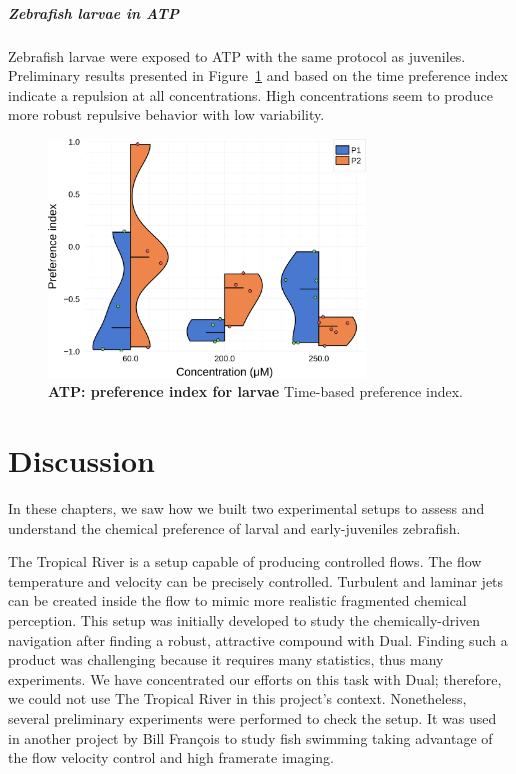     \paragraph{Zebrafish larvae in ATP} Zebrafish larvae were exposed to ATP with the same protocol as juveniles. Preliminary results presented in Figure~\ref{dist_atp_lar} and based on the time preference index indicate a repulsion at all concentrations. High concentrations seem to produce more robust repulsive behavior with low variability.

    \begin{figure}[h!]
      \centering
      \includegraphics[width=0.75\textwidth]{part_2/assets/dist_atp_lar.png}
      \caption{\textbf{ATP: preference index for larvae} Time-based preference index. }
      \label{dist_atp_lar}
    \end{figure}

  \chapter{Discussion}
  \label{discussion}
  In these chapters, we saw how we built two experimental setups to assess and understand the chemical preference of larval and early-juveniles zebrafish.

  The Tropical River is a setup capable of producing controlled flows. The flow temperature and velocity can be precisely controlled. Turbulent and laminar jets can be created inside the flow to mimic more realistic fragmented chemical perception. This setup was initially developed to study the chemically-driven navigation after finding a robust, attractive compound with Dual. Finding such a product was challenging because it requires many statistics, thus many experiments. We have concentrated our efforts on this task with Dual; therefore, we could not use The Tropical River in this project's context. Nonetheless, several preliminary experiments were performed to check the setup. It was used in another project by Bill François to study fish swimming taking advantage of the flow velocity control and high framerate imaging.

